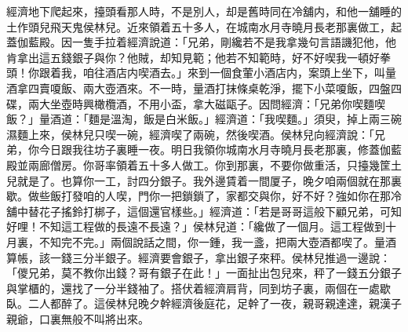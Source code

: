 經濟地下爬起來，擡頭看那人時，不是別人，却是舊時同在冷舖内，和他一舖睡的土作頭兒飛天鬼侯林兒。近來領着五十多人，在城南水月寺曉月長老那裏做工，起蓋伽藍殿。因一隻手拉着經濟說道：「兄弟，剛纔若不是我拿幾句言語譏犯他，他肯拿出這五錢銀子與你？他賊，却知見範；他若不知範時，好不好喫我一頓好拳頭！你跟着我，咱往酒店内喫酒去。」來到一個食葷小酒店内，案頭上坐下，叫量酒拿四賣嗄飯、兩大壺酒來。不一時，量酒打抹條桌乾淨，擺下小菜嗄飯，四盤四碟，兩大坐壺時興橄欖酒，不用小盃，拿大磁甌子。因問經濟：「兄弟你喫麵喫飯？」量酒道：「麵是溫淘，飯是白米飯。」經濟道：「我喫麵。」須臾，掉上兩三碗濕麵上來，侯林兒只喫一碗，經濟喫了兩碗，然後喫酒。侯林兒向經濟說：「兄弟，你今日跟我往坊子裏睡一夜。明日我領你城南水月寺曉月長老那裏，修蓋伽藍殿並兩廊僧房。你哥率領着五十多人做工。你到那裏，不要你做重活，只擡幾筐土兒就是了。也算你一工，討四分銀子。我外邊賃着一間厦子，晚夕咱兩個就在那裏歇。做些飯打發咱的人喫，門你一把鎖鎖了，家都交與你，好不好？強如你在那冷舖中替花子搖鈴打梆子，這個還官樣些。」經濟道：「若是哥哥這般下顧兄弟，可知好哩！不知這工程做的長遠不長遠？」侯林兒道：「纔做了一個月。這工程做到十月裏，不知完不完。」兩個說話之間，你一鍾，我一盞，把兩大壺酒都喫了。量酒算帳，該一錢三分半銀子。經濟要會銀子，拿出銀子來秤。侯林兒推過一邊說：「儍兄弟，莫不教你出錢？哥有銀子在此！」一面扯出包兒來，秤了一錢五分銀子與掌櫃的，還找了一分半錢袖了。搭伏着經濟肩背，同到坊子裏，兩個在一處歇臥。二人都醉了。這侯林兒晚夕幹經濟後庭花，足幹了一夜，親哥親達達，親漢子親爺，口裏無般不叫將出來。

